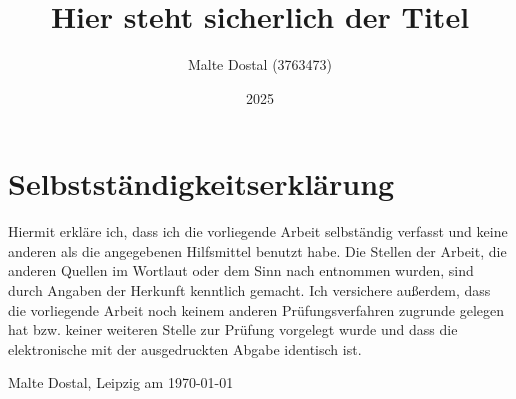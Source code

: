 \documentclass[11pt,a4paper,twoside]{scrreprt}
\title{Hier steht sicherlich der Titel}
\author{Malte Dostal (3763473)}
\date{2025}
\begin{document}
\maketitle
\cleardoublepage


\tableofcontents
\listoffigures
\cleardoublepage
{}

\chapter*{Selbstständigkeitserklärung}
Hiermit erkläre ich, dass ich die vorliegende Arbeit selbständig verfasst und
keine anderen als die angegebenen Hilfsmittel benutzt habe. Die Stellen der
Arbeit, die anderen Quellen im Wortlaut oder dem Sinn nach entnommen
wurden, sind durch Angaben der Herkunft kenntlich gemacht.
Ich versichere außerdem, dass die vorliegende Arbeit noch keinem anderen Prüfungsverfahren
zugrunde gelegen hat bzw. keiner weiteren Stelle zur Prüfung vorgelegt wurde
und dass die elektronische mit der ausgedruckten Abgabe identisch ist.
\par
\vspace{1.5cm}
Malte Dostal, Leipzig am \today

\printbibliography[heading=bibintoc]
\end{document}
